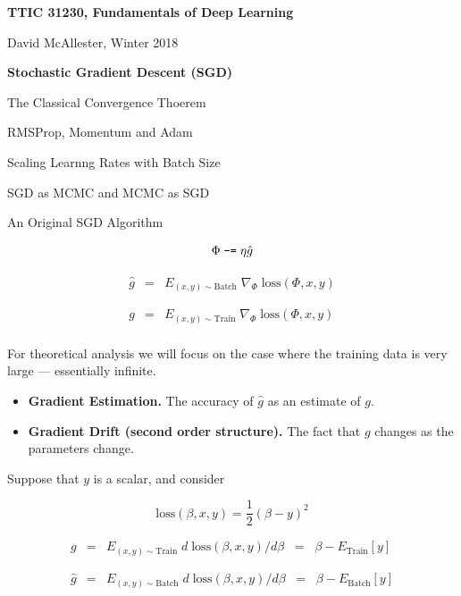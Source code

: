 



{\Huge
  \centerline{\bf TTIC 31230, Fundamentals of Deep Learning}
  \bigskip
  \centerline{David McAllester, Winter 2018}
  \vfill
  \centerline{\bf Stochastic Gradient Descent (SGD)}
  \vfill
  \centerline{The Classical Convergence Thoerem}
  \vfill
  \centerline{RMSProp, Momentum and Adam}
  \vfill
  \centerline{Scaling Learnng Rates with Batch Size}
  \vfill
  \centerline{SGD as MCMC and MCMC as SGD}
  \vfill
  \centerline{An Original SGD Algorithm}


$$\Phi \;\mbox{\tt -=}\; \eta \hat{g}$$

\vfill
\begin{eqnarray*}
  \hat{g} & = & E_{(x,y) \sim \mathrm{Batch}}\;\nabla_\Phi\;\mathrm{loss}(\Phi,x,y) \\
  \\
  \\
  g & = & E_{(x,y) \sim \mathrm{Train}}\;\nabla_\Phi\;\mathrm{loss}(\Phi,x,y) \\
\end{eqnarray*}

\vfill
For theoretical analysis we will focus on the case where the training data is very large --- essentially infinite.


\vfill
\begin{itemize}
\item {\bf Gradient Estimation.} The accuracy of $\hat{g}$ as an estimate of $g$.

  \vfill
\item {\bf Gradient Drift (second order structure).} The fact that $g$ changes as the parameters change.
\end{itemize}


Suppose that $y$ is a scalar, and consider

\vfill
$$\mathrm{loss}(\beta,x,y) = \frac{1}{2}(\beta - y)^2$$

\vfill
\begin{eqnarray*}
  g & = & E_{(x,y) \sim \mathrm{Train}}\; d\;\mathrm{loss}(\beta,x,y)/d \beta \;\;=\;\;\beta - E_{\mathrm{Train}}[y] \\
  \\
  \\
  \hat{g} & = & E_{(x,y) \sim \mathrm{Batch}} \; d\;\mathrm{loss}(\beta,x,y)/d \beta \;\;=\;\;\beta - E_{\mathrm{Batch}}[y]
\end{eqnarray*}

}
